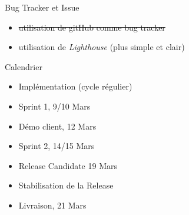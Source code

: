 \begin{frame}{Bug Tracker et Issue}
  \begin{block}{}
    \begin{itemize}
      \item \sout{utilisation de gitHub comme bug tracker}
      \item utilisation de \emph{Lighthouse} (plus simple et clair)
    \end{itemize}
  \end{block}
\end{frame}

\begin{frame}{Calendrier}
  \begin{itemize}
    \item Implémentation (cycle régulier) 
    \item Sprint 1, 9/10 Mars
    \item Démo client, 12 Mars
    \item Sprint 2, 14/15 Mars
    \item Release Candidate 19 Mars
    \item Stabilisation de la Release
    \item Livraison, 21 Mars
  \end{itemize}
\end{frame}

